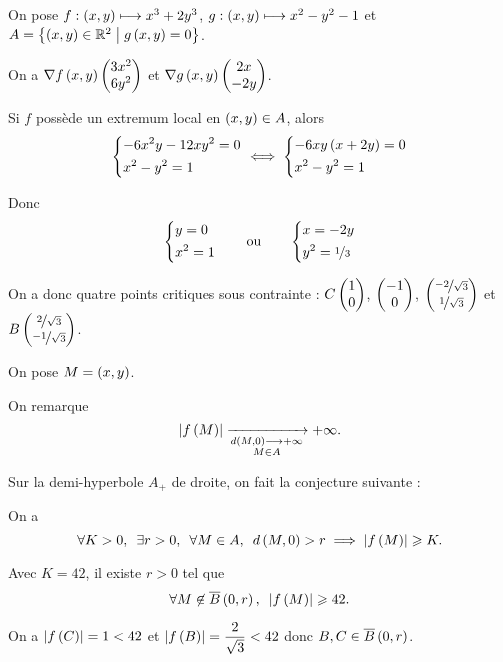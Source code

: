 \begin{corr}
On pose \(f:\left(x,y\right)\longmapsto x^3+2y^3\), \(g:\left(x,y\right)\longmapsto x^2-y^2-1\) et \(A=\left\lbrace\left(x,y\right)\in\mathbb{R}^2\;\middle|\; g\left(x,y\right)=0\right\rbrace\).

On a \(\nabla f\left(x,y\right)\begin{pmatrix}3x^2\\6y^2\end{pmatrix}\) et \(\nabla g\left(x,y\right)\begin{pmatrix}2x\\-2y\end{pmatrix}\).

Si \(f\) possède un extremum local en \(\left(x,y\right)\in A\), alors \[
\begin{dcases}
-6x^2y-12xy^2=0 \\
x^2-y^2=1
\end{dcases}\iff\begin{dcases}
-6xy\left(x+2y\right)=0 \\
x^2-y^2=1
\end{dcases}\]

Donc \[\begin{dcases}
y=0 \\
x^2=1
\end{dcases}\qquad\text{ou}\qquad\begin{dcases}
x=-2y \\
y^2=\nicefrac{1}{3}
\end{dcases}\]

On a donc quatre points critiques sous contrainte : \(C\begin{pmatrix}1\\0\end{pmatrix}\), \(\begin{pmatrix}-1\\0\end{pmatrix}\), \(\begin{pmatrix}\nicefrac{-2}{\sqrt{3}}\\\nicefrac{1}{\sqrt{3}}\end{pmatrix}\) et \(B\begin{pmatrix}\nicefrac{2}{\sqrt{3}}\\\nicefrac{-1}{\sqrt{3}}\end{pmatrix}\).

On pose \(M=\left(x,y\right)\).

On remarque \[\left\lvert f\left(M\right)\right\rvert\xrightarrow[\substack{d\left(M,0\right)\longrightarrow+\infty \\ M\in A}]{}+\infty.\]

Sur la demi-hyperbole \(A_+\) de droite, on fait la conjecture suivante : \begin{center}
\end{center}

On a \[\quantifs{\forall K>0;\exists r>0;\forall M\in A}d\paren{M,0}>r\imp\abs{f\paren{M}}\geq K.\]

Avec \(K=42\), il existe \(r>0\) tel que \[\quantifs{\forall M\not\in\boulef{0}{r}}\abs{f\paren{M}}\geq42.\]

On a \(\left\lvert f\left(C\right)\right\rvert=1<42\) et \(\left\lvert f\left(B\right)\right\rvert=\dfrac{2}{\sqrt{3}}<42\) donc \(B,C\in\boulef{0}{r}\).


\end{corr}
